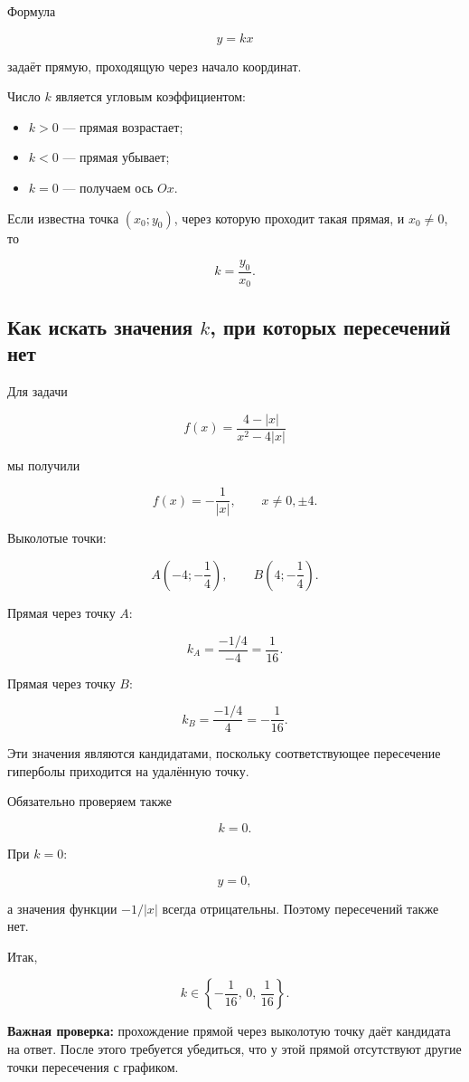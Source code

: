 \documentclass[a4paper,12pt]{article}
\newcommand{\key}[1]{\textcolor{darkaccent}{\textbf{#1}}}
\begin{document}
Формула

\[
y=kx
\]

задаёт прямую, проходящую через начало координат.

Число \(k\) является угловым коэффициентом:

\begin{itemize}
\item \(k>0\) --- прямая возрастает;
\item \(k<0\) --- прямая убывает;
\item \(k=0\) --- получаем ось \(Ox\).
\end{itemize}

Если известна точка \((x_0;y_0)\), через которую проходит такая прямая, и \(x_0\ne0\), то

\[
k=\frac{y_0}{x_0}.
\]

\subsection{Как искать значения \(k\), при которых пересечений нет}

Для задачи

\[
f(x)=
\frac{4-|x|}
{x^2-4|x|}
\]

мы получили

\[
f(x)=-\frac1{|x|},
\qquad
x\ne0,\pm4.
\]

Выколотые точки:

\[
A\left(-4;-\frac14\right),
\qquad
B\left(4;-\frac14\right).
\]

Прямая через точку \(A\):

\[
k_A=
\frac{-1/4}{-4}
=
\frac1{16}.
\]

Прямая через точку \(B\):

\[
k_B=
\frac{-1/4}{4}
=
-\frac1{16}.
\]

Эти значения являются кандидатами, поскольку соответствующее пересечение гиперболы приходится на удалённую точку.

Обязательно проверяем также

\[
k=0.
\]

При \(k=0\):

\[
y=0,
\]

а значения функции \(-1/|x|\) всегда отрицательны. Поэтому пересечений также нет.

Итак,

\[
\boxed{
k\in
\left\{
-\frac1{16},
\,0,\,
\frac1{16}
\right\}.
}
\]

\key{Важная проверка:}
прохождение прямой через выколотую точку даёт кандидата на ответ.
После этого требуется убедиться, что у этой прямой отсутствуют другие точки пересечения с графиком.
\end{document}
